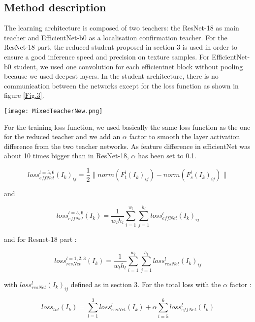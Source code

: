 \documentclass[a4paper,twoside]{article}
\begin{document}
\subsection{Method description}
The learning architecture is composed of two teachers: the ResNet-18 as main teacher and EfficientNet-b0 as a localisation confirmation teacher. For the ResNet-18 part, the reduced student proposed in section 3 is used in order to ensure a good inference speed and precision on texture samples. For EfficientNet-b0 student, we used one convolution for each efficientnet block without pooling because we used deepest layers. In the student architecture, there is no communication between the networks except for the loss function as shown in figure \ref{Fig.3}.
\begin{figure*}[h]
\centerline{\texttt{[image: MixedTeacherNew.png]}}
\renewcommand{\arraystretch}{1}
\caption{ 
MixedTeacher architecture. }
\label{Fig.3}
\end{figure*}

For the training loss function, we used basically the same loss function as the one for the reduced teacher and we add an $\alpha$ factor to smooth the layer activation difference from the two teacher networks. As feature difference in efficientNet was about 10 times bigger than in ResNet-18,  $\alpha$ has been set to 0.1.


\begin{equation}
loss_{effNet}^{l=5,6}(I_k)_{ij}=\frac{1}{2}\lVert norm(F_t^l(I_k)_{ij})-norm(F_s^l(I_k)_{ij}) \rVert
\label{eq.5}
\end{equation}

and 

\begin{equation}
loss_{effNet}^{l=5,6}(I_k)=\frac{1}{w_lh_l}  \sum_{i=1}^{w_l} \sum_{j=1}^{h_l} loss_{effNet}^l(I_k)_{ij}   
\label{eq.6}
\end{equation}


\noindent and for Resnet-18 part : 

\begin{equation}
loss_{resNet}^{l=1,2,3}(I_k)=\frac{1}{w_lh_l}  \sum_{i=1}^{w_l} \sum_{j=1}^{h_l} loss_{resNet}^l(I_k)_{ij}  
\label{eq.7} 
\end{equation}

\noindent with $loss_{resNet}^{l}(I_k)_{ij}$ defined as in section 3. For the total loss with the $\alpha$ factor : 

\begin{equation}
loss_{tot}(I_k)= \sum_{l=1}^{3} loss_{resNet}^{l}(I_k) + \alpha \sum_{l=5}^{6} loss_{effNet}^{l}(I_k)
\label{eq.8}
\end{equation}
\end{document}
